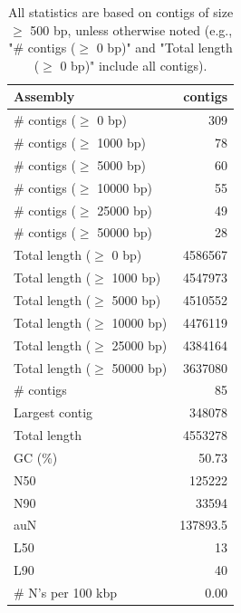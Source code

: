 \documentclass[12pt,a4paper]{article}
\begin{document}
\begin{table}[ht]
\begin{center}
\caption{All statistics are based on contigs of size $\geq$ 500 bp, unless otherwise noted (e.g., "\# contigs ($\geq$ 0 bp)" and "Total length ($\geq$ 0 bp)" include all contigs).}
\begin{tabular}{|l*{1}{|r}|}
\hline
Assembly & contigs \\ \hline
\# contigs ($\geq$ 0 bp) & 309 \\ \hline
\# contigs ($\geq$ 1000 bp) & 78 \\ \hline
\# contigs ($\geq$ 5000 bp) & 60 \\ \hline
\# contigs ($\geq$ 10000 bp) & 55 \\ \hline
\# contigs ($\geq$ 25000 bp) & 49 \\ \hline
\# contigs ($\geq$ 50000 bp) & 28 \\ \hline
Total length ($\geq$ 0 bp) & 4586567 \\ \hline
Total length ($\geq$ 1000 bp) & 4547973 \\ \hline
Total length ($\geq$ 5000 bp) & 4510552 \\ \hline
Total length ($\geq$ 10000 bp) & 4476119 \\ \hline
Total length ($\geq$ 25000 bp) & 4384164 \\ \hline
Total length ($\geq$ 50000 bp) & 3637080 \\ \hline
\# contigs & 85 \\ \hline
Largest contig & 348078 \\ \hline
Total length & 4553278 \\ \hline
GC (\%) & 50.73 \\ \hline
N50 & 125222 \\ \hline
N90 & 33594 \\ \hline
auN & 137893.5 \\ \hline
L50 & 13 \\ \hline
L90 & 40 \\ \hline
\# N's per 100 kbp & 0.00 \\ \hline
\end{tabular}
\end{center}
\end{table}
\end{document}
